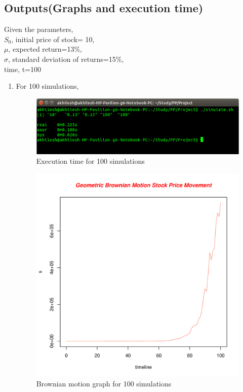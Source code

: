 \documentclass[10pt,a4paper]{article}
\begin{document}
\subsection{Outputs(Graphs and execution time)}
Given the parameters,\\
$S_{0}$, initial price of stock= 10,\\
$\mu$, expected return=13\%,\\
$\sigma$, standard  deviation of returns=15\%,\\
time, t=100
\begin{enumerate}
\item For 100 simulations,\\
\begin{figure}[h]
\centering
\includegraphics[scale=0.5]{100}
\caption{Execution time for 100 simulations}
\end{figure}
\begin{figure}[h]
\centering
\includegraphics[scale=0.5]{100_graph.pdf}
\caption{Brownian motion graph for 100 simulations}
\end{figure}


\end{enumerate}
\end{document}
